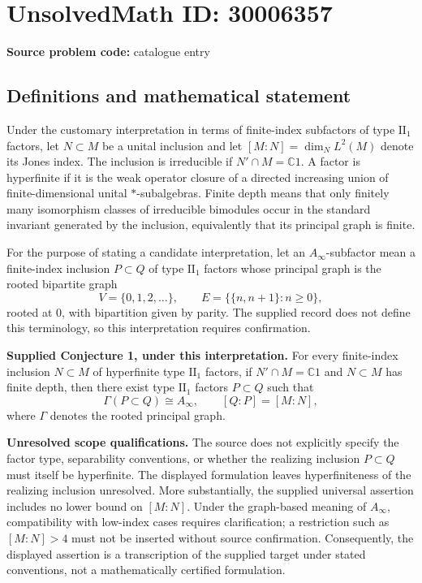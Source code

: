 \documentclass[11pt]{article}
\newcommand{\C}{\mathbb{C}}
\begin{document}
\section*{UnsolvedMath ID: 30006357}
\textbf{Source problem code:} catalogue entry
\subsection{Definitions and mathematical statement}
Under the customary interpretation in terms of finite-index subfactors of type \(\mathrm{II}_1\) factors, let \(N\subset M\) be a unital inclusion and let \([M:N]=\dim_N L^2(M)\) denote its Jones index. The inclusion is irreducible if \(N'\cap M=\C 1\). A factor is hyperfinite if it is the weak operator closure of a directed increasing union of finite-dimensional unital \(*\)-subalgebras. Finite depth means that only finitely many isomorphism classes of irreducible bimodules occur in the standard invariant generated by the inclusion, equivalently that its principal graph is finite.

For the purpose of stating a candidate interpretation, let an \(A_\infty\)-subfactor mean a finite-index inclusion \(P\subset Q\) of type \(\mathrm{II}_1\) factors whose principal graph is the rooted bipartite graph
\[
V=\{0,1,2,\ldots\},\qquad E=\bigl\{\{n,n+1\}:n\geq 0\bigr\},
\]
rooted at \(0\), with bipartition given by parity. The supplied record does not define this terminology, so this interpretation requires confirmation.

\textbf{Supplied Conjecture 1, under this interpretation.} For every finite-index inclusion \(N\subset M\) of hyperfinite type \(\mathrm{II}_1\) factors, if \(N'\cap M=\C1\) and \(N\subset M\) has finite depth, then there exist type \(\mathrm{II}_1\) factors \(P\subset Q\) such that
\[
\Gamma(P\subset Q)\cong A_\infty,
\qquad [Q:P]=[M:N],
\]
where \(\Gamma\) denotes the rooted principal graph.

\textbf{Unresolved scope qualifications.} The source does not explicitly specify the factor type, separability conventions, or whether the realizing inclusion \(P\subset Q\) must itself be hyperfinite. The displayed formulation leaves hyperfiniteness of the realizing inclusion unresolved. More substantially, the supplied universal assertion includes no lower bound on \([M:N]\). Under the graph-based meaning of \(A_\infty\), compatibility with low-index cases requires clarification; a restriction such as \([M:N]>4\) must not be inserted without source confirmation. Consequently, the displayed assertion is a transcription of the supplied target under stated conventions, not a mathematically certified formulation.
\end{document}
